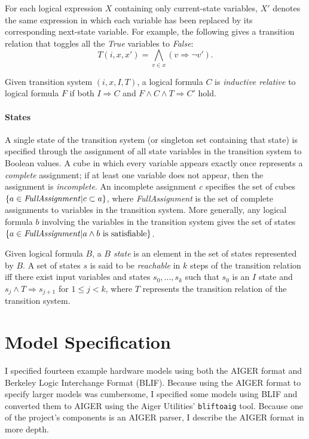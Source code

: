 \documentclass[12pt,a4paper,twoside,openright]{report}
\begin{document}
{{For each logical expression $X$ containing only current-state variables,
$X'$ denotes the same expression in which each variable has been
replaced by its corresponding next-state variable.
For example, the following gives a transition relation that toggles all the
{\it True} variables to {\it False}:
$$T(i,x,x') = \bigwedge_{v \in x} (v \Rightarrow \neg v').$$

Given transition system $(i,x,I,T)$, a logical formula $C$ is
\emph{inductive relative} to logical formula $F$ if both
$I \Rightarrow C$ and $F \wedge C \wedge T \Rightarrow C'$ hold.
}

\paragraph{States}{
A single state of the transition system (or singleton set containing that state)
is specified through the assignment of all state variables in the transition system
to Boolean values.
A cube in which every variable
appears exactly once represents a \emph{complete} assignment;
if at least one variable does not appear, then the assignment
is \emph{incomplete}.
An incomplete
assignment $c$ specifies the set of cubes $\{a \in{\it FullAssignment}|c \subset a\}$,
where {\it FullAssignment} is the set of complete assignments to variables in the
transition system.
More generally, any logical formula $b$ involving the variables in the transition
system gives the set of states
$\{a \in {\it FullAssignment} | a \wedge b~{\rm is~satisfiable}\}$.

Given logical formula $B$, a \emph{$B$ state} is an element in the set of states
represented
by $B$. A set of states $s$ is said to be \emph{reachable}
in $k$ steps of the transition relation iff there exist input variables and
states $s_0, \ldots, s_k$ such that
$s_0$ is an $I$ state and $s_j \wedge T \Rightarrow s_{j + 1}$ for $1 \leq j < k$,
where $T$ represents the transition relation of the transition system.

}


\section{Model Specification}
\label{prep:aiger}


I specified fourteen example hardware models using
both the AIGER format and Berkeley Logic Interchange Format (BLIF).
Because using the AIGER format to specify larger models was cumbersome,
I specified some models using BLIF and converted them to AIGER
using the Aiger Utilities' \verb,bliftoaig, tool. Because one of
the project's components is an AIGER parser, I describe the AIGER format
in more depth.

}
\end{document}

